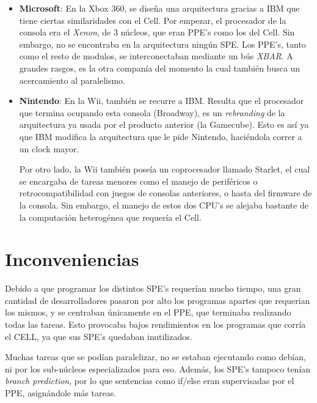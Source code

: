 \documentclass[10pt,compsoc]{IEEEtran}
\begin{document}
	\begin{itemize}
				
		\item{{\bf{Microsoft}}: En la Xbox 360, se diseña una arquitectura gracias a IBM que tiene ciertas similaridades con el Cell. Por empezar, el procesador de la consola era el \textit{Xenon}, de 3 núcleos, que eran PPE's como los del Cell. Sin embargo, no se encontraba en la arquitectura ningún SPE. Los PPE's, tanto como el resto de modulos, se interconectaban mediante un bús \textit{XBAR}. A grandes rasgos, es la otra companía del momento la cual también busca un acercamiento al paralelismo.}\newline
		
		\item{{\bf{Nintendo}}: En la Wii, también se recurre a IBM. Resulta que el procesador que termina ocupando esta consola (Broadway), es un \textit{rebranding} de la arquitectura ya usada por el producto anterior (la Gamecube). Esto es así ya que IBM modifica la arquitectura que le pide Nintendo, haciéndola correr a un clock mayor.\newline
		
		Por otro lado, la Wii también poseía un coprocesador llamado Starlet, el cual se encargaba de tareas menores como el manejo de periféricos o retrocompatibilidad con juegos de consolas anteriores, o hasta del firmware de la consola. Sin embargo, el manejo de estos dos CPU's se alejaba bastante de la computación heterogénea que requería el Cell.}
	\end{itemize}
	
	\section{Inconveniencias}
	\noindent Debido a que programar los distintos SPE's requerían mucho tiempo, una gran cantidad  de desarrolladores pasaron por alto los programas apartes que requerian los mismos, y se centraban únicamente en el PPE, que terminaba realizando todas las tareas. Esto provocaba bajos rendimientos en los programas que corría el CELL, ya que sus SPE's quedaban inutilizados.\newline
	
	Muchas tareas que se podían paralelizar, no se estaban ejecutando como debían, ni por los sub-núcleos especializados para eso. Además, los SPE's tampoco tenían \textit{branch prediction}, por lo que sentencias como if/else eran supervisadas por el PPE, asignándole más tareas.\newline
		
\end{document}
